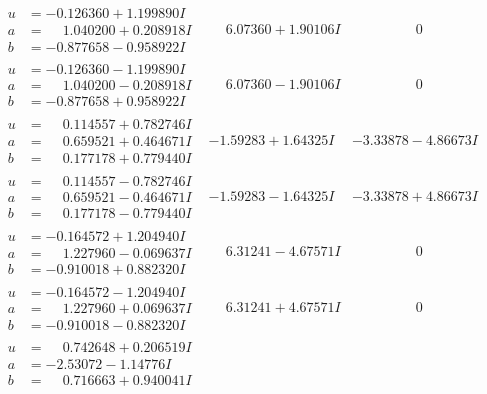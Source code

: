 \documentclass[1p]{elsarticle_modified}
\theoremstyle{definition}
\begin{document}
$$\begin{array}{c|c|c}
\begin{aligned}
u &= -0.126360 + 1.199890 I \\
a &= \phantom{-}1.040200 + 0.208918 I \\
b &= -0.877658 - 0.958922 I\end{aligned}
 & \phantom{-}6.07360 + 1.90106 I & \phantom{-0.000000 } 0 \\ \hline\begin{aligned}
u &= -0.126360 - 1.199890 I \\
a &= \phantom{-}1.040200 - 0.208918 I \\
b &= -0.877658 + 0.958922 I\end{aligned}
 & \phantom{-}6.07360 - 1.90106 I & \phantom{-0.000000 } 0 \\ \hline\begin{aligned}
u &= \phantom{-}0.114557 + 0.782746 I \\
a &= \phantom{-}0.659521 + 0.464671 I \\
b &= \phantom{-}0.177178 + 0.779440 I\end{aligned}
 & -1.59283 + 1.64325 I & -3.33878 - 4.86673 I \\ \hline\begin{aligned}
u &= \phantom{-}0.114557 - 0.782746 I \\
a &= \phantom{-}0.659521 - 0.464671 I \\
b &= \phantom{-}0.177178 - 0.779440 I\end{aligned}
 & -1.59283 - 1.64325 I & -3.33878 + 4.86673 I \\ \hline\begin{aligned}
u &= -0.164572 + 1.204940 I \\
a &= \phantom{-}1.227960 - 0.069637 I \\
b &= -0.910018 + 0.882320 I\end{aligned}
 & \phantom{-}6.31241 - 4.67571 I & \phantom{-0.000000 } 0 \\ \hline\begin{aligned}
u &= -0.164572 - 1.204940 I \\
a &= \phantom{-}1.227960 + 0.069637 I \\
b &= -0.910018 - 0.882320 I\end{aligned}
 & \phantom{-}6.31241 + 4.67571 I & \phantom{-0.000000 } 0 \\ \hline\begin{aligned}
u &= \phantom{-}0.742648 + 0.206519 I \\
a &= -2.53072 - 1.14776 I \\
b &= \phantom{-}0.716663 + 0.940041 I\end{aligned}

\end{array}$$
\end{document}
